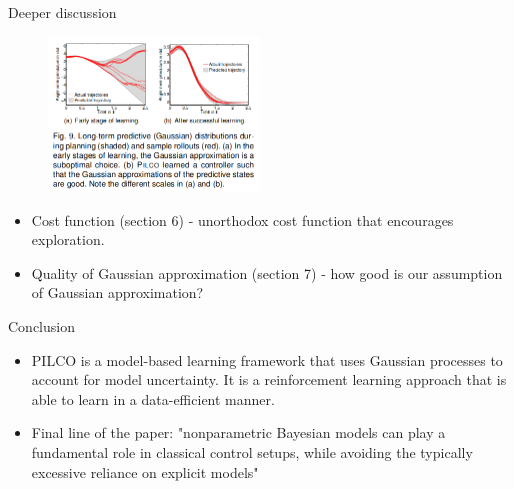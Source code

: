 \documentclass{beamer}
\begin{document}
\begin{frame}{Deeper discussion}
	
	\begin{figure}
		\includegraphics[width=0.5\textwidth]{./paper_fig9.png}
	\end{figure}
	
	\begin{itemize}
		\item Cost function (section 6) - unorthodox cost function that encourages exploration.
		\item Quality of Gaussian approximation (section 7) - how good is our assumption of Gaussian approximation? 
	\end{itemize}
\end{frame}
\begin{frame}{Conclusion}
	\begin{itemize}
		\item PILCO is a model-based learning framework that uses Gaussian processes to account for model uncertainty. It is a reinforcement learning approach that is able to learn in a data-efficient manner.
		\item Final line of the paper: "nonparametric Bayesian models can play a fundamental role in classical control setups, while avoiding the typically excessive reliance on explicit models"
	\end{itemize}
\end{frame}
\end{document}
